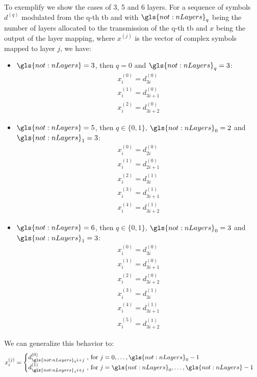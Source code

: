 To exemplify we show the cases of 3, 5 and 6 layers.
%
For a sequence of symbols $d^{(q)}$ modulated from the q-th \gls{tb} and with
$\gls{not:nLayers}_q$ being the number of layers allocated to the transmission of the q-th \gls{tb} and $x$ being the output of the layer mapping, where $x^{(j)}$ is the vector of complex symbols mapped to layer $j$, we have:
%
\begin{itemize}
    \item $\gls{not:nLayers} = 3 $, then $q=0$ and $\gls{not:nLayers}_q = 3$:
    $$
    \begin{gathered}
        x^{(0)}_{i} = d^{(0)}_{3 i} \\
        x^{(1)}_{i} = d^{(0)}_{3 i + 1} \\
        x^{(2)}_{i} = d^{(0)}_{3 i + 2}
    \end{gathered}
    $$
    \item $\gls{not:nLayers} = 5 $, then $q \in \{0,1\}$, $\gls{not:nLayers}_0 = 2$ and $\gls{not:nLayers}_1 = 3$:
    $$
    \begin{gathered}
        x^{(0)}_{i} = d^{(0)}_{2 i} \\
        x^{(1)}_{i} = d^{(0)}_{2 i + 1} \\
        x^{(2)}_{i} = d^{(1)}_{3 i} \\
        x^{(3)}_{i} = d^{(1)}_{3 i + 1} \\
        x^{(4)}_{i} = d^{(1)}_{3 i + 2}
    \end{gathered}
    $$
    \item $\gls{not:nLayers} = 6 $, then $q \in \{0,1\}$, $\gls{not:nLayers}_0 = 3$ and $\gls{not:nLayers}_1 = 3$:
    $$
    \begin{gathered}
        x^{(0)}_{i} = d^{(0)}_{3 i} \\
        x^{(1)}_{i} = d^{(0)}_{3 i + 1} \\
        x^{(2)}_{i} = d^{(0)}_{3 i + 2} \\
        x^{(3)}_{i} = d^{(1)}_{3 i} \\
        x^{(4)}_{i} = d^{(1)}_{3 i + 1} \\
        x^{(5)}_{i} = d^{(1)}_{3 i + 2}
    \end{gathered}
    $$
\end{itemize}

We can generalize this behavior to:
%
\begin{equation}
    x^{(j)}_{i} =
    \begin{cases}
          d^{(0)}_{\gls{not:nLayers}_0 i + j} \text{ , for } j=0,\ldots, \gls{not:nLayers}_0 - 1 \\
         d^{(1)}_{\gls{not:nLayers}_1 i + j} \text{ , for } j=\gls{not:nLayers}_0, \ldots, \gls{not:nLayers} - 1
    \end{cases}
\end{equation}


